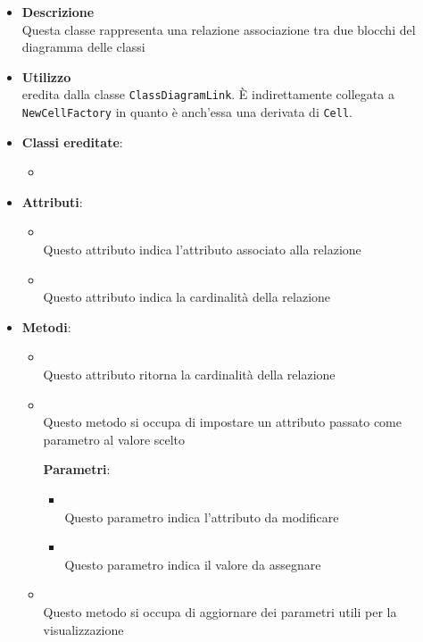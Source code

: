 \begin{itemize}
\item \textbf{Descrizione}\\
Questa classe rappresenta una relazione associazione tra due blocchi del diagramma delle classi
\item \textbf{Utilizzo}\\
eredita dalla classe \texttt{ClassDiagramLink}. È indirettamente collegata a \texttt{NewCellFactory} in quanto è anch'essa una derivata di \texttt{Cell}.
\item \textbf{Classi ereditate}:
\begin{itemize}
\item \hyperref[\nogloxy{swedesigner::client::model::celltypes::class::ClassDiagramLink}]{}
\end{itemize}
\item \textbf{Attributi}:
\begin{itemize}
\item {}
\\ Questo attributo indica l'attributo associato alla relazione
\item {}
\\ Questo attributo indica la cardinalità della relazione
\end{itemize}
\item \textbf{Metodi}:
\begin{itemize}
\item {}
\\ Questo attributo ritorna la cardinalità della relazione
\item {}
\\ Questo metodo si occupa di impostare un attributo passato come parametro al valore scelto

\textbf{Parametri}:
\begin{itemize}
\item {}
\\ Questo parametro indica l'attributo da modificare

\item {}
\\ Questo parametro indica il valore da assegnare

\end{itemize}
\item {}
\\ Questo metodo si occupa di aggiornare dei parametri utili per la visualizzazione
\end{itemize}
\end{itemize}

